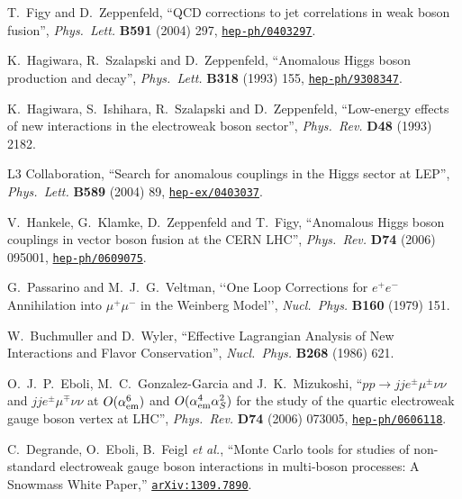 \documentclass[english,12pt]{article}
\begin{document}
\begin{thebibliography}{10}
T.~Figy and D.~Zeppenfeld, ``{QCD corrections to jet correlations in weak boson
  fusion}'', {\em Phys.\ Lett.} {\bf B591} (2004) 297,
\href{http://www.arXiv.org/abs/hep-ph/0403297}{{\tt hep-ph/0403297}}.

K.~Hagiwara, R.~Szalapski and D.~Zeppenfeld, ``{Anomalous Higgs boson
  production and decay}'', {\em Phys.\ Lett.} {\bf B318} (1993) 155,
\href{http://www.arXiv.org/abs/hep-ph/9308347}{{\tt hep-ph/9308347}}.

K.~Hagiwara, S.~Ishihara, R.~Szalapski and D.~Zeppenfeld, ``{Low-energy effects
  of new interactions in the electroweak boson sector}'', {\em Phys.\ Rev.} {\bf
  D48} (1993) 2182.

{L3} Collaboration, ``{Search for anomalous couplings in
  the Higgs sector at LEP}'', {\em Phys.\ Lett.} {\bf B589} (2004) 89,
\href{http://www.arXiv.org/abs/hep-ex/0403037}{{\tt hep-ex/0403037}}.

V.~Hankele, G.~Klamke, D.~Zeppenfeld and T.~Figy, ``{Anomalous Higgs boson
  couplings in vector boson fusion at the CERN LHC}'', {\em Phys.\ Rev.} {\bf
  D74} (2006) 095001,
\href{http://www.arXiv.org/abs/hep-ph/0609075}{{\tt hep-ph/0609075}}.

  G.~Passarino and M.~J.~G.~Veltman,
  `{`One Loop Corrections for $e^+e^-$ Annihilation into $\mu^+\mu^-$ in the Weinberg
  Model}'',
  {\em Nucl.\ Phys.}  {\bf B160} (1979) 151.

W.~Buchmuller and D.~Wyler, ``{Effective Lagrangian Analysis of New Interactions
  and Flavor Conservation}'', {\em Nucl.\ Phys.} {\bf B268} (1986)
621.

O.~J.~P.~Eboli, M.~C.~Gonzalez-Garcia and J.~K.~Mizukoshi, 
                  ``{$p p \to j j e^\pm \mu^\pm \nu \nu$ and $j j e^\pm \mu^\mp \nu \nu$ at
                  $O(\alpha_{\rm em}^6)$ and $O(\alpha_{\rm em}^4 \alpha_S^2)$ for the
                  study of the quartic electroweak gauge boson vertex at
                  LHC}'', {\em Phys.\ Rev.} {\bf D74} (2006) 073005,
\href{http://www.arXiv.org/abs/hep-ph/0606118}{{\tt hep-ph/0606118}}.

  C.~Degrande, O.~Eboli, B.~Feigl {\it et al.},
  ``Monte Carlo tools for studies of non-standard electroweak gauge boson interactions in multi-boson processes: A Snowmass White Paper,''
  \href{http://arxiv.org/abs/1309.7890}{{\tt arXiv:1309.7890}}.


\end{thebibliography}
\end{document}
